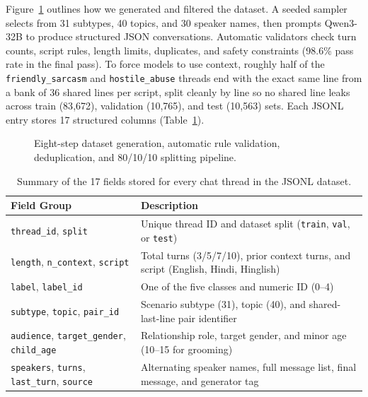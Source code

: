 \documentclass[11pt,a4paper]{article}
\begin{document}
Figure~\ref{fig:datagen} outlines how we generated and filtered the dataset. A seeded sampler selects from 31 subtypes, 40 topics, and 30 speaker names, then prompts Qwen3-32B \cite{qwen3} to produce structured JSON conversations. Automatic validators check turn counts, script rules, length limits, duplicates, and safety constraints (98.6\% pass rate in the final pass). To force models to use context, roughly half of the \texttt{friendly\_sarcasm} and \texttt{hostile\_abuse} threads end with the exact same line from a bank of 36 shared lines per script, split cleanly by line so no shared line leaks across train (83{,}672), validation (10{,}765), and test (10{,}563) sets. Each JSONL entry stores 17 structured columns (Table~\ref{tab:schema}).

\begin{figure}[H]
  \centering
  \resizebox{\textwidth}{!}{}
  \caption{Eight-step dataset generation, automatic rule validation, deduplication, and 80/10/10 splitting pipeline.}
  \label{fig:datagen}
\end{figure}

\begin{table}[H]
\centering
\caption{Summary of the 17 fields stored for every chat thread in the JSONL dataset.}
\label{tab:schema}
\small
\begin{tabularx}{0.95\textwidth}{l X}
\toprule
\textbf{Field Group} & \textbf{Description} \\
\midrule
\texttt{thread\_id}, \texttt{split} & Unique thread ID and dataset split (\texttt{train}, \texttt{val}, or \texttt{test}) \\
\texttt{length}, \texttt{n\_context}, \texttt{script} & Total turns (3/5/7/10), prior context turns, and script (English, Hindi, Hinglish) \\
\texttt{label}, \texttt{label\_id} & One of the five classes and numeric ID (0--4) \\
\texttt{subtype}, \texttt{topic}, \texttt{pair\_id} & Scenario subtype (31), topic (40), and shared-last-line pair identifier \\
\texttt{audience}, \texttt{target\_gender}, \texttt{child\_age} & Relationship role, target gender, and minor age (10--15 for grooming) \\
\texttt{speakers}, \texttt{turns}, \texttt{last\_turn}, \texttt{source} & Alternating speaker names, full message list, final message, and generator tag \\
\bottomrule
\end{tabularx}
\end{table}
\end{document}
